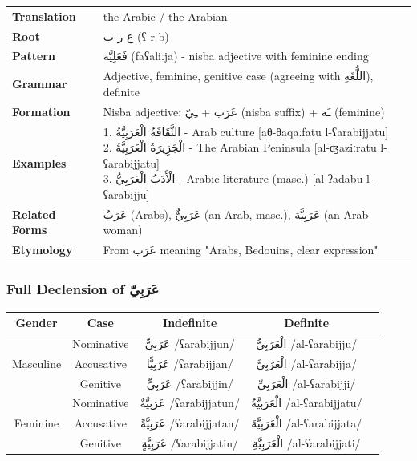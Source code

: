 \documentclass[letterpaper,12pt]{article}
\begin{document}
\begin{tabular}{p{3cm}p{10cm}}
\toprule
\textbf{Translation} & the Arabic / the Arabian \\
\textbf{Root} & \textarabic{ع-ر-ب} (ʕ-r-b) \\
\textbf{Pattern} & \textarabic{فَعَلِيَّة} (faʕaliːja) - nisba adjective with feminine ending \\
\textbf{Grammar} & Adjective, feminine, genitive case (agreeing with \textarabic{اللُّغَةِ}), definite \\
\midrule
\textbf{Formation} & Nisba adjective: \textarabic{عَرَب} + \textarabic{ـِيّ} (nisba suffix) + \textarabic{ـَة} (feminine) \\
\midrule
\textbf{Examples} & \makecell[l]{\parbox{9.5cm}{
1. \textarabic{الثَّقَافَةُ الْعَرَبِيَّةُ} - Arab culture [aθ-θaqaːfatu l-ʕarabijjatu]\\
2. \textarabic{الْجَزِيرَةُ الْعَرَبِيَّةُ} - The Arabian Peninsula [al-ʤaziːratu l-ʕarabijjatu]\\
3. \textarabic{الْأَدَبُ الْعَرَبِيُّ} - Arabic literature (masc.) [al-ʔadabu l-ʕarabijju]
}} \\
\midrule
\textbf{Related Forms} & \textarabic{عَرَبٌ} (Arabs), \textarabic{عَرَبِيٌّ} (an Arab, masc.), \textarabic{عَرَبِيَّة} (an Arab woman) \\
\textbf{Etymology} & From \textarabic{عَرَب} meaning "Arabs, Bedouins, clear expression" \\
\bottomrule
\end{tabular}

\subsubsection*{Full Declension of \textarabic{عَرَبِيّ}}

\begin{tabular}{|c|c|c|c|c|}
\hline
\textbf{Gender} & \textbf{Case} & \textbf{Indefinite} & \textbf{Definite} \\
\hline
\multirow{3}{*}{Masculine}
& Nominative & \textarabic{عَرَبِيٌّ} /ʕarabijjun/ & \textarabic{الْعَرَبِيُّ} /al-ʕarabijju/ \\
& Accusative & \textarabic{عَرَبِيًّا} /ʕarabijjan/ & \textarabic{الْعَرَبِيَّ} /al-ʕarabijja/ \\
& Genitive & \textarabic{عَرَبِيٍّ} /ʕarabijjin/ & \textarabic{الْعَرَبِيِّ} /al-ʕarabijji/ \\
\hline
\multirow{3}{*}{Feminine}
& Nominative & \textarabic{عَرَبِيَّةٌ} /ʕarabijjatun/ & \textarabic{الْعَرَبِيَّةُ} /al-ʕarabijjatu/ \\
& Accusative & \textarabic{عَرَبِيَّةً} /ʕarabijjatan/ & \textarabic{الْعَرَبِيَّةَ} /al-ʕarabijjata/ \\
& Genitive & \textarabic{عَرَبِيَّةٍ} /ʕarabijjatin/ & \textarabic{الْعَرَبِيَّةِ} /al-ʕarabijjati/ \\
\hline
\end{tabular}
\end{document}
